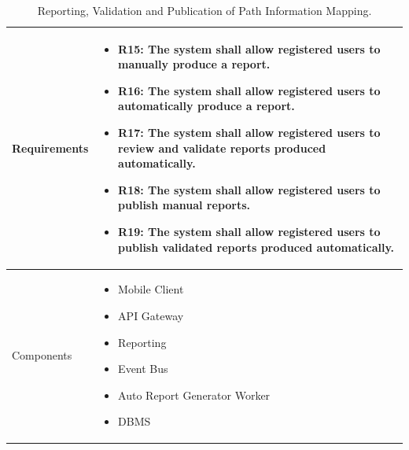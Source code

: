 \begin{table}[H]
    \centering
    \renewcommand{\arraystretch}{1.3}
    \begin{tabular}{|p{}|p{}|}
        \hline
        Requirements & \begin{itemize}[topsep=0pt, partopsep=0pt, leftmargin=*]
            \item R15: The system shall allow registered users to manually produce a report.
            \item R16: The system shall allow registered users to automatically produce a report.
            \item R17: The system shall allow registered users to review and validate reports produced automatically.
            \item R18: The system shall allow registered users to publish manual reports.
            \item R19: The system shall allow registered users to publish validated reports produced automatically.
        \end{itemize} \\
        \hline
        Components & \begin{itemize}[topsep=0pt, partopsep=0pt, leftmargin=*] 
            \item Mobile Client
            \item API Gateway
            \item Reporting
            \item Event Bus
            \item Auto Report Generator Worker
            \item DBMS
        \end{itemize} \\
        \hline
    \end{tabular}
    \caption{Reporting, Validation and Publication of Path Information Mapping.}
    \label{tab:reporting_mapping}
\end{table}

